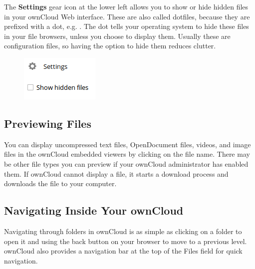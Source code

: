 \documentclass[letterpaper,10pt,english]{sphinxmanual}
\begin{document}
The \textbf{Settings} gear icon at the lower left allows you to show or hide hidden
files in your ownCloud Web interface. These are also called dotfiles, because
they are prefixed with a dot, e.g. . The dot tells your operating
system to hide these files in your file browsers, unless you choose to display
them. Usually these are configuration files, so having the option to hide them
reduces clutter.
\begin{figure}[htbp]
\centering

\includegraphics{hidden_files.png}
\end{figure}


\subsection{Previewing Files}
\label{files/access_webgui:previewing-files}
You can display uncompressed text files, OpenDocument files, videos, and image
files in the ownCloud embedded viewers by clicking on the file name. There may
be other file types you can preview if your ownCloud administrator has enabled
them. If ownCloud cannot display a file, it starts a download process and
downloads the file to your computer.


\subsection{Navigating Inside Your ownCloud}
\label{files/access_webgui:navigating-inside-your-owncloud}
Navigating through folders in ownCloud is as simple as clicking on a folder to
open it and using the back button on your browser to move to a previous level.
ownCloud also provides a navigation bar at the top of the Files field for quick
navigation.
\end{document}
